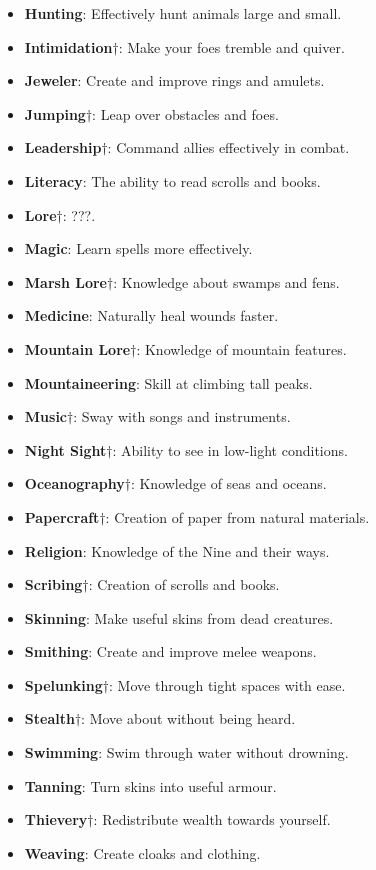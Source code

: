 \begin{itemize}
\item {\bf Hunting}: Effectively hunt animals large and small. 
\item {\bf Intimidation}$\dagger$: Make your foes tremble and quiver. 
\item {\bf Jeweler}: Create and improve rings and amulets. 
\item {\bf Jumping}$\dagger$: Leap over obstacles and foes.
\item {\bf Leadership}$\dagger$: Command allies effectively in combat. 
\item {\bf Literacy}: The ability to read scrolls and books.
\item {\bf Lore}$\dagger$: ???. 
\item {\bf Magic}: Learn spells more effectively. 
\item {\bf Marsh Lore}$\dagger$: Knowledge about swamps and fens. 
\item {\bf Medicine}: Naturally heal wounds faster. 
\item {\bf Mountain Lore}$\dagger$: Knowledge of mountain features. 
\item {\bf Mountaineering}: Skill at climbing tall peaks. 
\item {\bf Music}$\dagger$: Sway with songs and instruments. 
\item {\bf Night Sight}$\dagger$: Ability to see in low-light conditions. 
\item {\bf Oceanography}$\dagger$: Knowledge of seas and oceans. 
\item {\bf Papercraft}$\dagger$: Creation of paper from natural materials. 
\item {\bf Religion}: Knowledge of the Nine and their ways. 
\item {\bf Scribing}$\dagger$: Creation of scrolls and books. 
\item {\bf Skinning}: Make useful skins from dead creatures. 
\item {\bf Smithing}: Create and improve melee weapons.
\item {\bf Spelunking}$\dagger$: Move through tight spaces with ease.
\item {\bf Stealth}$\dagger$: Move about without being heard.
\item {\bf Swimming}: Swim through water without drowning.
\item {\bf Tanning}: Turn skins into useful armour.
\item {\bf Thievery}$\dagger$: Redistribute wealth towards yourself.
\item {\bf Weaving}: Create cloaks and clothing.
\end{itemize}

